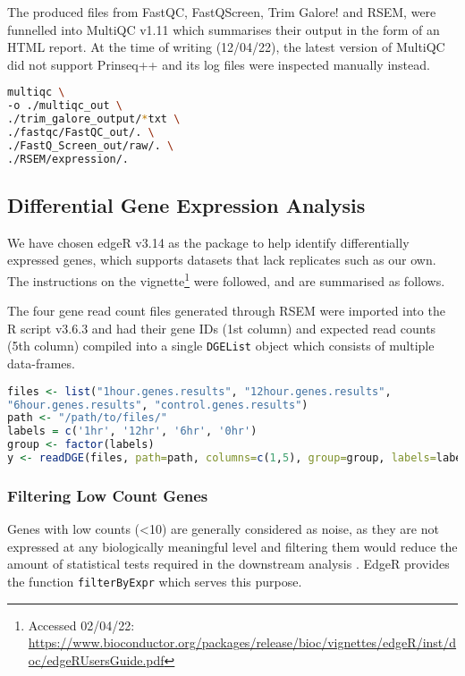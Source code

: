 The produced files from FastQC, FastQScreen, Trim Galore! and RSEM, were funnelled into MultiQC v1.11 \citep{multiqc} which summarises their output in the form of an HTML report. At the time of writing (12/04/22), the latest version of MultiQC did not support Prinseq++ and its log files were inspected manually instead.

\begin{lstlisting}[language=bash, caption=MultiQC command]
multiqc \
-o ./multiqc_out \
./trim_galore_output/*txt \
./fastqc/FastQC_out/. \
./FastQ_Screen_out/raw/. \
./RSEM/expression/.
\end{lstlisting}

\subsection{Differential Gene Expression Analysis}

We have chosen edgeR v3.14 \citep{edger} as the package to help identify differentially expressed genes, which supports datasets that lack replicates such as our own. The instructions on the vignette\footnote{Accessed 02/04/22: \url{https://www.bioconductor.org/packages/release/bioc/vignettes/edgeR/inst/doc/edgeRUsersGuide.pdf}} were followed, and are summarised as follows. 

The four gene read count files generated through RSEM were imported into the R script v3.6.3 \citep{R} and had their gene IDs (1st column) and expected read counts (5th column) compiled into a single \texttt{DGEList} object which consists of multiple data-frames. 

\begin{lstlisting}[language=R, caption=Importing count files to R]
files <- list("1hour.genes.results", "12hour.genes.results", 
"6hour.genes.results", "control.genes.results")
path <- "/path/to/files/"
labels = c('1hr', '12hr', '6hr', '0hr')
group <- factor(labels)
y <- readDGE(files, path=path, columns=c(1,5), group=group, labels=labels)
\end{lstlisting}

\subsubsection{Filtering Low Count Genes}

Genes with low counts (<10) are generally considered as noise, as they are not expressed at any biologically meaningful level and filtering them would reduce the amount of statistical tests required in the downstream analysis \citep{law2016rna}. EdgeR provides the function \texttt{filterByExpr} which serves this purpose.

